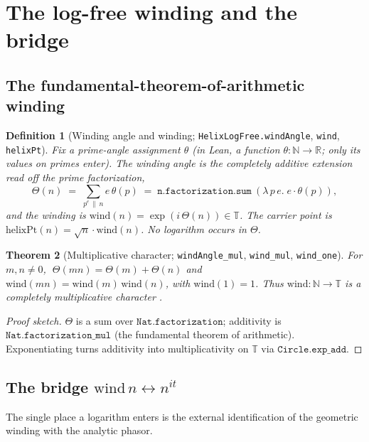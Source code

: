 \documentclass[11pt]{article}
\newtheorem{definition}{Definition}[section]
\newtheorem{theorem}[definition]{Theorem}
\newcommand{\R}{\mathbb{R}}
\newcommand{\N}{\mathbb{N}}
\newcommand{\T}{\mathbb{T}}
\newcommand{\code}[1]{\texttt{#1}}
\begin{document}
\section{The log-free winding and the bridge}\label{sec:winding}

\subsection{The fundamental-theorem-of-arithmetic winding}

\begin{definition}[Winding angle and winding; \code{HelixLogFree.windAngle}, \code{wind}, \code{helixPt}]\label{def:wind}
Fix a prime-angle assignment $\theta$ (in Lean, a function $\theta:\N\to\R$; only its values on primes
enter).
The \emph{winding angle} is the completely additive extension read off the prime factorization,
\[
  \Theta(n) \;=\; \sum_{p^{e}\,\|\,n} e\,\theta(p)
  \;=\; \code{n.factorization.sum}\ (\lambda\, p\, e.\; e\cdot\theta(p)),
\]
and the \emph{winding} is $\mathrm{wind}(n)=\exp(i\,\Theta(n))\in\T$. The carrier point is
$\mathrm{helixPt}(n)=\sqrt n\cdot \mathrm{wind}(n)$. No logarithm occurs in $\Theta$.
\end{definition}

\begin{theorem}[Multiplicative character; \code{windAngle\_mul}, \code{wind\_mul}, \code{wind\_one}]\label{thm:windmul}
For $m,n\neq 0$, $\;\Theta(mn)=\Theta(m)+\Theta(n)$ and $\mathrm{wind}(mn)=\mathrm{wind}(m)\,\mathrm{wind}(n)$,
with $\mathrm{wind}(1)=1$. Thus $\mathrm{wind}:\N\to\T$ is a completely multiplicative character
\cite{Apostol1976}.
\end{theorem}

\begin{proof}[Proof sketch]
$\Theta$ is a sum over $\code{Nat.factorization}$; additivity is $\code{Nat.factorization\_mul}$
(the fundamental theorem of arithmetic). Exponentiating turns additivity into multiplicativity on
$\T$ via $\code{Circle.exp\_add}$.
\end{proof}

\subsection{The bridge $\mathrm{wind}\,n\leftrightarrow n^{it}$}

The single place a logarithm enters is the external identification of the geometric winding with the
analytic phasor.
\end{document}
